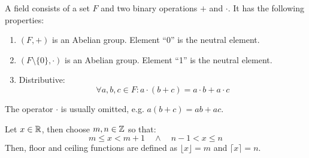 \begin{definition}[Field]
    A field consists of a set $F$ and two binary operations $+$ and $\cdot$.
    It has the following properties:
    \begin{enumerate}
        \item $(F,+)$ is an Abelian group. Element ``0'' is the neutral element.
        \item $(F\setminus\{0\},\cdot)$ is an Abelian group. Element ``1'' is the neutral element.
        \item Distributive:
            \begin{equation}
                \forall a,b,c \in F: a \cdot (b + c) = a \cdot b + a \cdot c
            \end{equation}
    \end{enumerate}
    The operator $\cdot$ is usually omitted, e.g. $a (b + c) = ab + ac$.
\end{definition}

\begin{definition}
    Let $x \in \mathbb{R}$, then choose $m,n \in \mathbb{Z}$ so that:
    \begin{equation}
        m \le x < m + 1 \quad \land \quad n - 1 < x \le n
    \end{equation}
    Then, floor and ceiling functions are defined as 
    $\lfloor x \rfloor = m$ and 
    $\lceil x \rceil = n$.
\end{definition}

